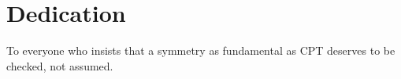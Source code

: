 \chapter*{Dedication}

To everyone who insists that a symmetry as fundamental as CPT deserves to be
checked, not assumed.

